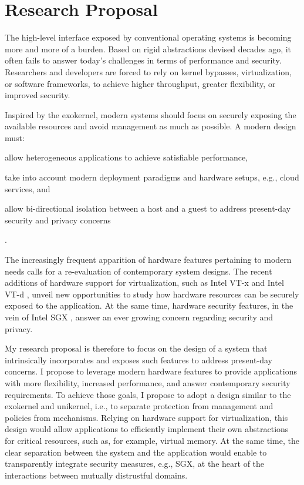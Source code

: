 \section{Research Proposal}

The high-level interface exposed by conventional operating systems is becoming more and more of a burden.
Based on rigid abstractions devised decades ago, it often fails to answer today's challenges in terms of performance and security.
Researchers and developers are forced to rely on kernel bypasses, virtualization, or software frameworks, to achieve higher throughput, greater flexibility, or improved security.

Inspired by the exokernel, modern systems should focus on securely exposing the available resources and avoid management as much as possible.
A modern design must:
\begin{enumerate*}
	\item allow heterogeneous applications to achieve satisfiable performance,
	\item take into account modern deployment paradigms and hardware setups, e.g., cloud services, and 
	\item allow bi-directional isolation between a host and a guest to address present-day security and privacy concerns
\end{enumerate*}.

The increasingly frequent apparition of hardware features pertaining to modern needs \cite{HardIsSoft} calls for a re-evaluation of contemporary system designs.
The recent additions of hardware support for virtualization, such as Intel VT-x \cite{DBLP:journals/computer/UhligNRSMABKLS05} and Intel VT-d \cite{intelVTD}, unveil new opportunities to study how hardware resources can be securely exposed to the application.
At the same time, hardware security features, in the vein of Intel SGX \cite{SGXManual}, answer an ever growing concern regarding security and privacy.

My research proposal is therefore to focus on the design of a system that intrinsically incorporates and exposes such features to address present-day concerns.
I propose to leverage modern hardware features to provide applications with more flexibility, increased performance, and answer contemporary security requirements.
To achieve those goals, I propose to adopt a design similar to the exokernel and unikernel, i.e., to separate protection from management and policies from mechanisms.
Relying on hardware support for virtualization, this design would allow applications to efficiently implement their own abstractions for critical resources, such as, for example, virtual memory.
At the same time, the clear separation between the system and the application would enable to transparently integrate security measures, e.g., SGX, at the heart of the interactions between mutually distrustful domains.
